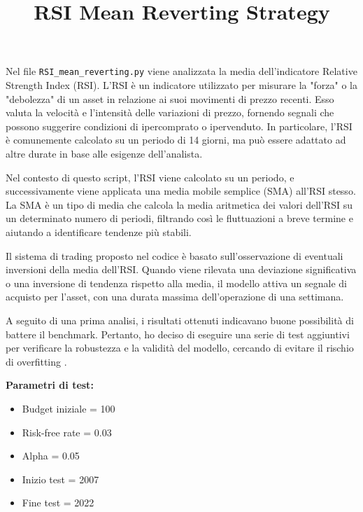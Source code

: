 \documentclass{article}
\title{RSI Mean Reverting Strategy}
\author{}
\date{}
\begin{document}
\maketitle

Nel file \texttt{RSI\_mean\_reverting.py} viene analizzata la media dell'indicatore Relative Strength Index (RSI). L'RSI è un indicatore utilizzato per misurare la "forza" o la "debolezza" di un asset in relazione ai suoi movimenti di prezzo recenti. Esso valuta la velocità e l'intensità delle variazioni di prezzo, fornendo segnali che possono suggerire condizioni di ipercomprato o ipervenduto. In particolare, l'RSI è comunemente calcolato su un periodo di 14 giorni, ma può essere adattato ad altre durate in base alle esigenze dell'analista.

Nel contesto di questo script, l'RSI viene calcolato su un periodo, e successivamente viene applicata una media mobile semplice (SMA) all'RSI stesso. La SMA è un tipo di media che calcola la media aritmetica dei valori dell'RSI su un determinato numero di periodi, filtrando così le fluttuazioni a breve termine e aiutando a identificare tendenze più stabili.

Il sistema di trading proposto nel codice è basato sull'osservazione di eventuali inversioni della media dell'RSI. Quando viene rilevata una deviazione significativa o una inversione di tendenza rispetto alla media, il modello attiva un segnale di acquisto per l'asset, con una durata massima dell'operazione di una settimana.

A seguito di una prima analisi, i risultati ottenuti indicavano buone possibilità di battere il benchmark. Pertanto, ho deciso di eseguire una serie di test aggiuntivi per verificare la robustezza e la validità del modello, cercando di evitare il rischio di overfitting \hspace{1em} \hspace{1em}.

\vspace{2em}  %

\textbf{Parametri di test:}
\begin{itemize}
    \item Budget iniziale = 100
    \item Risk-free rate = 0.03
    \item Alpha = 0.05
    \item Inizio test = 2007
    \item Fine test = 2022
\end{itemize}
\end{document}
